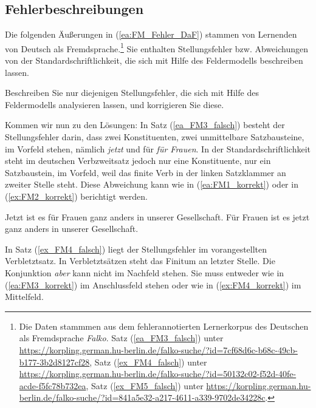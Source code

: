  
\subsection{Fehlerbeschreibungen}\label{subsection:FM3}
\largerpage
Die folgenden Äußerungen in (\ref{ea:FM_Fehler_DaF}) stammen von Lernenden von Deutsch als Fremdsprache.\footnote{Die Daten stammmen aus dem fehlerannotierten Lernerkorpus des Deutschen als Fremdsprache \textit{Falko}. Satz (\ref{ea_FM3_falsch}) unter \url{https://korpling.german.hu-berlin.de/falko-suche/?id=7cf68d6c-b68c-49cb-b177-3b2d8127cf28}, Satz (\ref{ex_FM4_falsch}) unter \url{https://korpling.german.hu-berlin.de/falko-suche/?id=50132c02-f52d-40fe-acde-f5fc78b732ea}, Satz (\ref{ex_FM5_falsch}) unter \url{https://korpling.german.hu-berlin.de/falko-suche/?id=841a5e32-a217-4611-a339-9702de34228c}.} Sie enthalten Stellungsfehler bzw. Abweichungen von der Standardschriftlichkeit, die sich mit Hilfe des Feldermodells beschreiben lassen. 

\ea \label{ea:FM_Fehler_DaF}
\label{ea_FM3_falsch}
\label{ex_FM4_falsch}
\label{ex_FM5_falsch}
\z 
\z 

Beschreiben Sie nur diejenigen Stellungsfehler, die sich mit Hilfe des Feldermodells analysieren lassen, und korrigieren Sie diese. 


Kommen wir nun zu den Lösungen: In Satz (\ref{ea_FM3_falsch}) besteht der Stellungsfehler darin, dass zwei Konstituenten, zwei unmittelbare Satzbausteine, im Vorfeld stehen, nämlich \textit{jetzt} und für \textit{für Frauen}. In der Standardschriftlichkeit steht im deutschen Verbzweitsatz jedoch nur eine Konstituente, nur ein Satzbaustein, im Vorfeld, weil das finite Verb in der linken Satzklammer an zweiter Stelle steht. Diese Abweichung kann wie in (\ref{ea:FM1_korrekt}) oder in (\ref{ex:FM2_korrekt}) berichtigt werden.

\ea 
\ea \label{ea:FM1_korrekt} Jetzt ist es für Frauen ganz anders in unserer Gesellschaft.
\ex \label{ex:FM2_korrekt} Für Frauen ist es jetzt ganz anders in unserer Gesellschaft.
\z 
\z 

In Satz (\ref{ex_FM4_falsch}) liegt der Stellungsfehler im vorangestellten Verbletztsatz. In Verbletztsätzen steht das Finitum an letzter Stelle. Die Konjunktion \textit{aber} kann nicht im Nachfeld stehen. Sie muss entweder wie in (\ref{ea:FM3_korrekt}) im Anschlussfeld stehen oder wie in (\ref{ex:FM4_korrekt}) im Mittelfeld.

